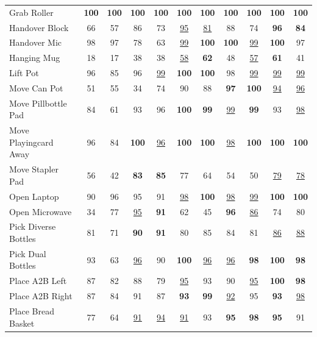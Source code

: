 \begin{center}
\begin{minipage}{\linewidth}
\begin{tabular*}{\linewidth}{@{\extracolsep{\fill}}l*{10}{c}@{}}
        Grab Roller & \textbf{100} & \textbf{100} & \textbf{100} & \textbf{100} & \textbf{100} & \textbf{100} & \textbf{100} & \textbf{100} & \textbf{100} & \textbf{100} \\
        Handover Block & 66 & 57 & 86 & 73 & \underline{95} & \underline{81} & 88 & 74 & \textbf{96} & \textbf{84} \\
        Handover Mic & 98 & 97 & 78 & 63 & \underline{99} & \textbf{100} & \textbf{100} & \underline{99} & \textbf{100} & 97 \\
        Hanging Mug & 18 & 17 & 38 & 38 & \underline{58} & \textbf{62} & 48 & \underline{57} & \textbf{61} & 41 \\
        Lift Pot & 96 & 85 & 96 & \underline{99} & \textbf{100} & \textbf{100} & 98 & \underline{99} & \underline{99} & \underline{99} \\
        Move Can Pot & 51 & 55 & 34 & 74 & 90 & 88 & \textbf{97} & \textbf{100} & \underline{94} & \underline{96} \\
        Move Pillbottle Pad & 84 & 61 & 93 & 96 & \textbf{100} & \textbf{99} & \underline{99} & \textbf{99} & 93 & \underline{98} \\
        Move Playingcard Away & 96 & 84 & \textbf{100} & \underline{96} & \textbf{100} & \textbf{100} & \underline{98} & \textbf{100} & \textbf{100} & \textbf{100} \\
        Move Stapler Pad & 56 & 42 & \textbf{83} & \textbf{85} & 77 & 64 & 54 & 50 & \underline{79} & \underline{78} \\
        Open Laptop & 90 & 96 & 95 & 91 & \underline{98} & \textbf{100} & \underline{98} & \underline{99} & \textbf{100} & \textbf{100} \\
        Open Microwave & 34 & 77 & \underline{95} & \textbf{91} & 62 & 45 & \textbf{96} & \underline{86} & 74 & 80 \\
        Pick Diverse Bottles & 81 & 71 & \textbf{90} & \textbf{91} & 80 & 85 & 84 & 81 & \underline{86} & \underline{88} \\
        Pick Dual Bottles & 93 & 63 & \underline{96} & 90 & \textbf{100} & \underline{96} & \underline{96} & \textbf{98} & \textbf{100} & \textbf{98} \\
        Place A2B Left & 87 & 82 & 88 & 79 & \underline{95} & 93 & 90 & \underline{95} & \textbf{100} & \textbf{98} \\
        Place A2B Right & 87 & 84 & 91 & 87 & \textbf{93} & \textbf{99} & \underline{92} & 95 & \textbf{93} & \underline{98} \\
        Place Bread Basket & 77 & 64 & \underline{91} & \underline{94} & \underline{91} & 93 & \textbf{95} & \textbf{98} & \textbf{95} & 91 \\

\end{tabular*}
\end{minipage}
\end{center}

